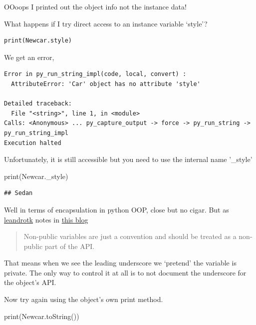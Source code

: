 \documentclass[]{book}
\newenvironment{Shaded}{\begin{snugshade}}{\end{snugshade}}
\newcommand{\BuiltInTok}[1]{#1}
\newcommand{\NormalTok}[1]{#1}
\theoremstyle{definition}
\theoremstyle{definition}
\theoremstyle{definition}
\theoremstyle{remark}
\begin{document}
OOoops I printed out the object info not the instance data!

What happens if I try direct access to an instance variable `style'?

\begin{verbatim}
print(Newcar.style)
\end{verbatim}

We get an error,

\begin{verbatim}
Error in py_run_string_impl(code, local, convert) : 
  AttributeError: 'Car' object has no attribute 'style'

Detailed traceback: 
  File "<string>", line 1, in <module>
Calls: <Anonymous> ... py_capture_output -> force -> py_run_string -> py_run_string_impl
Execution halted
\end{verbatim}

Unfortunately, it is still accessible but you need to use the internal
name '\_style'

\begin{Shaded}
\begin{Highlighting}[]
\BuiltInTok{print}\NormalTok{(Newcar._style)}
\end{Highlighting}
\end{Shaded}

\begin{verbatim}
## Sedan
\end{verbatim}

Well in terms of encapsulation in python OOP, close but no cigar. But as
\href{https://medium.com/@leandrotk_}{leandrotk} notes in
\href{https://medium.com/the-renaissance-developer/python-101-object-oriented-programming-part-2-8e0db3ddd531}{this
blog}

\begin{quote}
Non-public variables are just a convention and should be treated as a
non-public part of the API.
\end{quote}

That means when we see the leading underscore we `pretend' the variable
is private. The only way to control it at all is to not document the
underscore for the object's API.

Now try again using the object's own print method.

\begin{Shaded}
\begin{Highlighting}[]
\BuiltInTok{print}\NormalTok{(Newcar.toString())}
\end{Highlighting}
\end{Shaded}
\end{document}
